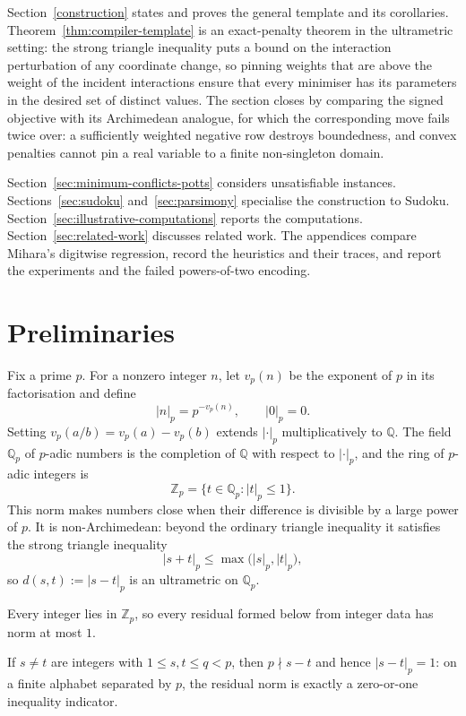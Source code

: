 \documentclass[11pt]{article}
\begin{document}
Section~\ref{construction} states and proves the general template and its corollaries. Theorem~\ref{thm:compiler-template} is an exact-penalty theorem in the ultrametric setting: the strong triangle inequality puts a bound on the interaction perturbation of any coordinate change, so pinning weights that are above the weight of the incident interactions ensure that every minimiser has its parameters in the desired set of distinct values. The section closes by comparing the signed objective with its Archimedean analogue, for which the corresponding move fails twice over: a sufficiently weighted negative row destroys boundedness, and convex penalties cannot pin a real variable to a finite non-singleton domain.

Section~\ref{sec:minimum-conflicts-potts} considers unsatisfiable instances. Sections~\ref{sec:sudoku} and~\ref{sec:parsimony} specialise the construction to Sudoku. Section~\ref{sec:illustrative-computations} reports the computations. Section~\ref{sec:related-work} discusses related work. The appendices compare Mihara's digitwise regression, record the heuristics and their traces, and report the experiments and the failed powers-of-two encoding.

\section{Preliminaries}
\label{sec:preliminaries}

Fix a prime \(p\). For a nonzero integer \(n\), let \(v_p(n)\) be the exponent of \(p\) in its factorisation and define
\[
|n|_p=p^{-v_p(n)},
\qquad
|0|_p=0.
\]
Setting \(v_p(a/b)=v_p(a)-v_p(b)\) extends \(|\cdot|_p\) multiplicatively to \(\mathbb Q\). The field \(\mathbb Q_p\) of \(p\)-adic numbers is the completion of \(\mathbb Q\) with respect to \(|\cdot|_p\), and the ring of \(p\)-adic integers is
\[
\mathbb Z_p=\{t\in\mathbb Q_p:|t|_p\le 1\}.
\]
This norm makes numbers close when their difference is divisible by a large power of \(p\). It is non-Archimedean: beyond the ordinary triangle inequality it satisfies the strong triangle inequality
\[
|s+t|_p\le\max\bigl(|s|_p,|t|_p\bigr),
\]
so \(d(s,t):=|s-t|_p\) is an ultrametric on \(\mathbb Q_p\).

Every integer lies in \(\mathbb Z_p\), so every residual formed below from integer data has norm at most \(1\).

If \(s\neq t\) are integers with \(1\le s,t\le q<p\), then \(p\nmid s-t\) and hence \(|s-t|_p=1\): on a finite alphabet separated by \(p\), the residual norm is exactly a zero-or-one inequality indicator.
\end{document}
